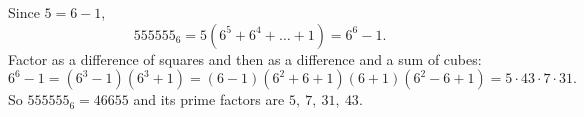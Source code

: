 Since $5=6-1$,
\[
555555_6=5(6^5+6^4+\dots+1)=6^6-1 .
\]
Factor as a difference of squares and then as a difference and a sum of cubes:
\[
6^6-1=(6^3-1)(6^3+1)=(6-1)(6^2+6+1)(6+1)(6^2-6+1)=5\cdot43\cdot7\cdot31 .
\]
So $555555_6=46655$ and its prime factors are $\boxed{5,\ 7,\ 31,\ 43}$.

